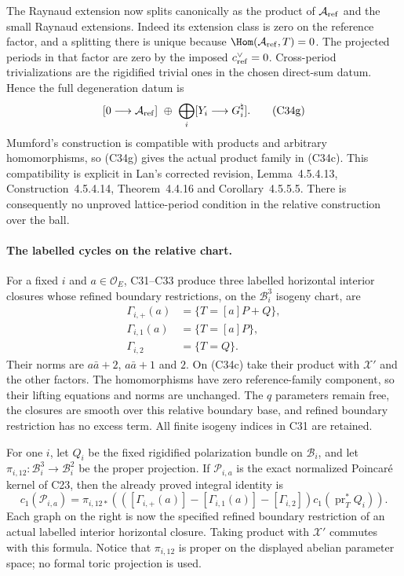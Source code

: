 \documentclass[11pt]{article}
\theoremstyle{definition}\newtheorem{definition}[theorem]{Definition}\newtheorem{remark}[theorem]{Remark}
\begin{document}
The Raynaud extension now splits
canonically as the product of
$\mathcal A_{\rm ref}$ and the small
Raynaud extensions. Indeed its extension
class is zero on the reference factor,
and a splitting there is unique because
$\Hom(\mathcal A_{\rm ref},T)=0$.
The projected periods in that factor
are zero by the imposed
$c^\vee_{\rm ref}=0$. Cross-period
trivializations are the rigidified
trivial ones in the chosen direct-sum
datum. Hence the full degeneration
datum is
\[
 [0\longrightarrow\mathcal A_{\rm ref}]
       \ \oplus\ \bigoplus_i[Y_i\longrightarrow G_i^{\natural}].
                                                        \tag{C34g}
\]
Mumford's construction is compatible
with products and arbitrary
homomorphisms, so (C34g) gives the
actual product family in (C34c).
This compatibility is explicit in
Lan's corrected revision,
Lemma~4.5.4.13, Construction~4.5.4.14,
Theorem~4.4.16 and
Corollary~4.5.5.5. There is consequently
no unproved lattice-period condition
in the relative construction over the
ball.

\paragraph{The labelled cycles on the relative chart.}
For a fixed $i$ and $a\in\mathcal O_E$,
C31--C33 produce three labelled
horizontal interior closures whose
refined boundary restrictions, on the
$\mathcal B_i^3$ isogeny chart, are
\[
 \begin{aligned}
 \Gamma_{i,+}(a)&=\{T=[a]P+Q\},\\
 \Gamma_{i,1}(a)&=\{T=[a]P\},\\
 \Gamma_{i,2}&=\{T=Q\}.
 \end{aligned}                                         \tag{C34h}
\]
Their norms are $a\bar a+2$, $a\bar a+1$
and $2$. On (C34c) take their product
with $\mathcal X'$ and the other
factors. The homomorphisms have zero
reference-family component, so their
lifting equations and norms are
unchanged. The $q$ parameters remain
free, the closures are smooth over
this relative boundary base, and
refined boundary restriction has no
excess term. All finite isogeny
indices in C31 are retained.

For one $i$, let $Q_i$ be the fixed
rigidified polarization bundle on
$\mathcal B_i$, and let
$\pi_{i,12}:\mathcal B_i^3\to\mathcal B_i^2$
be the proper projection. If
$\mathcal P_{i,a}$ is the exact
normalized Poincar\'e kernel of C23,
then the already proved integral
identity is
\[
 c_1(\mathcal P_{i,a})=
 \pi_{i,12*}\left(
  ([\Gamma_{i,+}(a)]-[\Gamma_{i,1}(a)]-[\Gamma_{i,2}])
                         c_1(\operatorname{pr}_T^*Q_i)\right).
                                                        \tag{C34i}
\]
Each graph on the right is now the
specified refined boundary restriction
of an actual labelled interior
horizontal closure. Taking product
with $\mathcal X'$ commutes with this
formula. Notice that $\pi_{i,12}$ is
proper on the displayed abelian
parameter space; no formal toric
projection is used.
\end{document}
